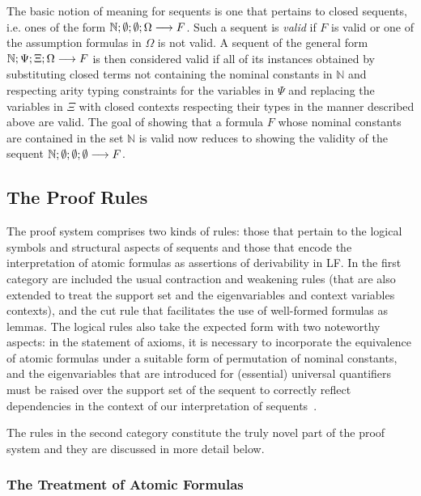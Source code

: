 The basic notion of meaning for sequents is one that pertains to
closed sequents, i.e. ones of the form
$\mathbb{N};\emptyset;\emptyset;\Omega\longrightarrow F$. 
%
Such a sequent is \emph{valid} if $F$ is valid or one of the
assumption formulas in $\Omega$ is not valid.
%
A sequent of the general form
$\mathbb{N};\Psi;\Xi;\Omega\longrightarrow F$ is then considered valid if
all of its instances obtained by substituting closed terms not
containing the nominal constants in $\mathbb{N}$ and respecting arity
typing constraints for the variables in $\Psi$ and replacing the
variables in $\Xi$ with closed contexts respecting their types in the
manner described above are valid.
%
The goal of showing that a formula $F$ whose nominal
constants are contained in the set $\mathbb{N}$ is valid now reduces to
showing the validity of the sequent $\mathbb{N};\emptyset;\emptyset;\emptyset\longrightarrow F$.

\subsection{The Proof Rules}\label{ssec:proofrules}

The proof system comprises two kinds of rules: those that pertain
to the logical symbols and structural aspects of sequents and those
that encode the interpretation of atomic formulas as assertions of
derivability in LF.
%
In the first category are included the usual contraction and weakening
rules (that are also extended to treat the support set and the
eigenvariables and context variables contexts), and the cut rule that
facilitates the use of well-formed formulas as lemmas.
%
The logical rules also take the expected form with two noteworthy
aspects: in the statement of axioms, it is necessary to incorporate
the equivalence of atomic formulas under a suitable form of
permutation of nominal constants, and the eigenvariables that are
introduced for (essential) universal quantifiers must be
raised over the support set of the sequent to correctly reflect
dependencies in the context of our interpretation of
sequents~\cite{miller92jsc}. 

The rules in the second category constitute the truly novel part of
the proof system and they are discussed in more detail below.

\subsubsection{The Treatment of Atomic Formulas}

